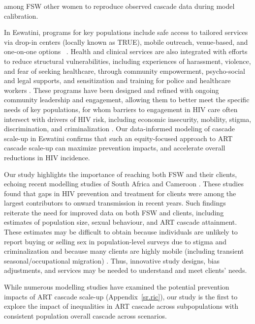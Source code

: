 among FSW \vs other women to reproduce observed cascade data during model calibration.
\par
In Eswatini, programs for key populations include safe access to tailored services via
drop-in centers (locally known as TRUE), mobile outreach, venue-based, and one-on-one options~%
\cite{EswIBBS2022}.
Health and clinical services are also integrated with
efforts to reduce structural vulnerabilities, including
experiences of harassment, violence, and fear of seeking healthcare,
through community empowerment, psycho-social and legal supports, and
sensitization and training for police and healthcare workers \cite{EswIBBS2022}.
These programs have been designed and refined with ongoing community leadership and engagement,
allowing them to better meet the specific needs of key populations,
for whom barriers to engagement in HIV care often intersect with drivers of HIV risk,
including economic insecurity, mobility, stigma, discrimination, and criminalization
\cite{Lancaster2016sr,Wanyenze2016,Schwartz2017,Schmidt-Sane2022,Camlin2019,Baral2019}.
Our data-informed modeling of cascade scale-up in Eswatini confirms that
such an equity-focused approach to ART cascade scale-up
can maximize prevention impacts, and accelerate overall reductions in HIV incidence.
\par
Our study highlights the importance of reaching both FSW and their clients,
echoing recent modelling studies of South Africa and Cameroon \cite{Stone2021,Silhol2024}.
These studies found that gaps in HIV prevention and treatment for clients
were among the largest contributors to onward transmission in recent years.
Such findings reiterate the need for improved data on both FSW and clients,
including estimates of population size, sexual behaviour, and ART cascade attainment.
These estimates may be difficult to obtain
because individuals are unlikely to report buying or selling sex in population-level surveys
due to stigma and criminalization \cite{Behanzin2013} and
because many clients are highly mobile
(including transient seasonal/occupational migration) \cite{Camlin2019}.
Thus, innovative study designs, bias adjustments, and services may be needed
to understand and meet clients' needs.
\par
While numerous modelling studies have examined
the potential prevention impacts of ART cascade scale-up
\cite{Knight2022sr} (Appendix~\ref{sr.ric}),
our study is the first to explore the impact of
inequalities in ART cascade across subpopulations
with consistent population overall cascade across scenarios.
